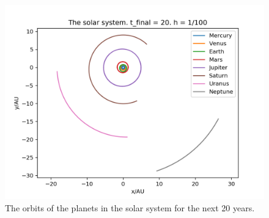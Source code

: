\documentclass{article}
\begin{document}
 
\begin{figure}
  \includegraphics[width=\linewidth]{solar_system20.png}
  \caption{The orbits of the planets in the solar system for the next 20 years.}
  \label{fig:solar_system20}
\end{figure}
\end{document}
